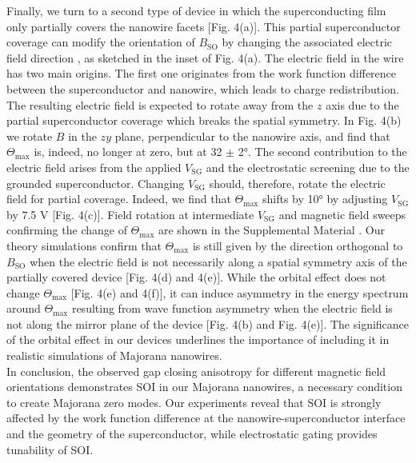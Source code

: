 Finally, we turn to a second type of device in which the superconducting film only partially covers the nanowire facets [Fig. 4(a)]. This partial superconductor coverage can modify the orientation of $B_{\mathrm{SO}}$ by changing the associated electric field direction \cite{Vuik2016}, as sketched in the inset of Fig. 4(a). The electric field in the wire has two main origins. The first one originates from the work function difference between the superconductor and nanowire, which leads to charge redistribution. The resulting electric field is expected to rotate away from the $z$ axis due to the partial superconductor coverage which breaks the spatial symmetry. In Fig. 4(b) we rotate $B$ in the $zy$ plane, perpendicular to the nanowire axis, and find that $\Theta_{\mathrm{max}}$ is, indeed, no longer at zero, but at 32 $\pm$ \ang{2}. The second contribution to the electric field arises from the applied $V_{\mathrm{SG}}$ and the electrostatic screening due to the grounded superconductor. Changing $V_{\mathrm{SG}}$ should, therefore, rotate the electric field for partial coverage. Indeed, we find that $\Theta_{\mathrm{max}}$ shifts by \ang{10} by adjusting $V_{\mathrm{SG}}$ by 7.5 V [Fig. 4(c)]. Field rotation at intermediate $V_{\mathrm{SG}}$ and magnetic field sweeps confirming the change of $\Theta_{\mathrm{max}}$ are shown in the Supplemental Material \cite{Note1}. Our theory simulations confirm that $\Theta_{\mathrm{max}}$ is still given by the direction orthogonal to $B_{\mathrm{SO}}$ when the electric field is not necessarily along a \mbox{spatial} symmetry axis of the partially covered device [Fig. 4(d) and 4(e)]. While the orbital effect does not change $\Theta_{\mathrm{max}}$ [Fig. 4(e) and 4(f)], it can induce asymmetry in the energy spectrum around $\Theta_{\mathrm{max}}$ resulting from wave function asymmetry when the electric field is not along the mirror plane of the device [Fig. 4(b) and Fig. 4(e)]. The significance of the orbital effect in our devices underlines the importance of including it in realistic simulations of Majorana nanowires.
\\ \indent
In conclusion, the observed gap closing anisotropy for different magnetic field orientations demonstrates SOI in our Majorana nanowires, a necessary condition to create Majorana zero modes. Our experiments reveal that SOI is strongly affected by the work function difference at the nanowire-superconductor interface and the geometry of the superconductor, while electrostatic gating provides tunability of SOI.


